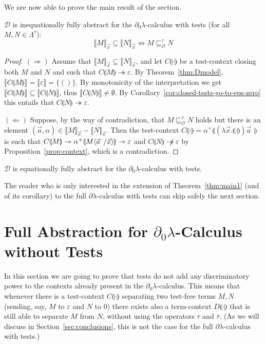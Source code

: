 \documentclass{LMCS}
\newcommand{\dlam}{\ensuremath{\partial\lambda}}
\newcommand{\dzlam}{\ensuremath{\partial_0\lambda}}
\newcommand{\lam}{\ensuremath{\lambda}}
\renewcommand{\hole}[1]{\llparenthesis #1\rrparenthesis}
\newcommand{\Set}[1]{\Lambda^{#1}}
\newcommand{\msto}{\twoheadrightarrow}
\newcommand{\Tobsle}{\sqsubseteq^{\gt}_{\mathcal{O}}}
\newcommand{\Int}[1]{\llbracket #1\rrbracket} \newcommand{\trm}[1]{#1^{\textrm{--}}}
\newcommand{\cont}[2]{#1^{+}\hole{#2}}
\renewcommand{\iff}{\Leftrightarrow}
\newcommand{\seq}[1]{\vec{#1}}
\newcommand{\imp}{\Rightarrow}
\newcommand{\gt}{\ensuremath{\tau}}
\newcommand{\gto}{\ensuremath{\bar\tau}}
\newcommand{\cD}{\mathcal{D}}
\begin{document}
We are now able to prove the main result of the section. 

\begin{thm}\label{thm:main1} 
$\cD$ is inequationally fully abstract for the \dzlam-calculus with tests (for all $M,N\in\Set{\gto}$):
$$
\Int{M}_{\seq x}\subseteq \Int{N}_{\seq x} \iff M\Tobsle N
$$
\end{thm}

\begin{proof} 
$(\imp)$ 
Assume that $\Int{M}_{\seq x}\subseteq\Int{N}_{\seq x}$, 
and let  $C\hole{\cdot}$ be a test-context closing both $M$ and 
$N$ and such that $C\hole{M}\msto\varepsilon$.
By Theorem~\ref{thm:Dmodel}, $\Int{C\hole{M}} = \Int{\varepsilon} = \{()\}$.
By monotonicity of the interpretation we get $\Int{C\hole{M}}\subseteq\Int{C\hole{N}}$,
thus $\Int{C\hole{N}}\neq\emptyset$. 
By Corollary~\ref{cor:closed-tests-go-to-eps-zero} this entails that $C\hole{N}\msto \varepsilon$. 

$(\Leftarrow)$ Suppose, by the way of contradiction, that $M\Tobsle N$ holds but 
there is an element $(\seq a,\alpha)\in\Int{M}_{\seq x}-\Int{N}_{\seq x}$.
Then the test-context $C\hole{\cdot} = \cont{\alpha}{(\lam\seq x.\hole{\cdot})\trm{\seq{a}}}$
is such that $C\hole{M}\msto \cont{\alpha}{M\lsubst{\seq{x}}{\trm{\seq{a}}}}\msto \varepsilon$
and $C\hole{N}\not\msto \varepsilon$ by Proposition~\ref{prop:context},
which is a contradiction.
\end{proof}

\begin{cor}\label{cor:main1}  $\cD$ is equationally fully abstract for the \dzlam-calculus with tests.
\end{cor}
The reader who is only interested in the extension of Theorem~\ref{thm:main1} (and of its corollary) to the full \dlam-calculus with tests 
can skip safely the next section.
 \section{Full Abstraction for $\dzlam$-Calculus without Tests}\label{sec:FA-notests-nobang}


In this section we are going to prove that tests do not add any discriminatory power 
to the contexts already present in the \dzlam-calculus.
This means that whenever there is a test-context $C\hole{\cdot}$ separating two test-free terms $M,N$ (sending, say, $M$ to $\varepsilon$ and $N$ to 0)
there exists also a term-context $D\hole{\cdot}$ that is still able to separate $M$ from $N$, without using the operators $\gt$ and $\gto$.
(As we will discuss in Section~\ref{sec:conclusions}, this is not the case for the full $\dlam$-calculus with tests.)
\end{document}
